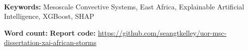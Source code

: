 ~\\[1cm]
\noindent
\textbf{Keywords:} Mesoscale Convective Systems, East Africa, Explainable Artificial Intelligence, XGBoost, SHAP

\vfill
\noindent
\textbf{Word count:}  \newline
\newline
\noindent
\textbf{Report code:} \href{https://github.com/seangtkelley/uor-msc-dissertation-xai-african-storms}{https://github.com/seangtkelley/uor-msc-dissertation-xai-african-storms}  \newline


